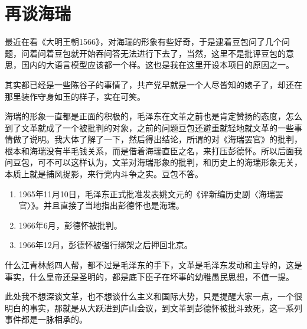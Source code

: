 \documentclass[12pt,oneside]{book}
\begin{document}
\chapter{再谈海瑞}
最近在看《大明王朝1566》，对海瑞的形象有些好奇，于是逮着豆包问了几个问题，问着问着豆包就开始吞问答无法进行下去了，当然，这里不是批评豆包的意思，国内的大语言模型应该都一个样。这也是我在这里开设本项目的原因之一。

其实都已经是一些陈谷子的事情了，共产党早就是一个人尽皆知的婊子了，却还在那里装作守身如玉的样子，实在可笑。

海瑞的形象一直都是正面的积极的，毛泽东在文革之前也是肯定赞扬的态度，怎么到了文革就成了一个被批判的对象，之前的问题豆包还避重就轻地就文革的一些事情做了说明。我大体了解了一下，然后得出结论，所谓的对《海瑞罢官》的批判，根本和海瑞没有半毛钱关系，而是借着海瑞直臣之名，来打压彭德怀。所以后面我问豆包，可不可以这样认为，文革对海瑞形象的批判，和历史上的海瑞形象无关，本质上就是捕风捉影，来行党内斗争之实。豆包不答。

\begin{enumerate}
\item 1965年11月10日，毛泽东正式批准发表姚文元的《评新编历史剧〈海瑞罢官〉》。并且直接了当地指出彭德怀也是海瑞。
\item 1966年6月，彭德怀被批判。
\item 1966年12月，彭德怀被强行绑架之后押回北京。
\end{enumerate}

什么江青林彪四人帮，都不过是毛泽东的手下，文革是毛泽东发动和主导的，这是事实，什么皇帝还是圣明的，都是底下臣子在坏事的幼稚愚民思想，不值一提。

此处我不想深谈文革，也不想谈什么主义和国际大势，只是提醒大家一点，一个很明白的事实，那就是从大跃进到庐山会议，到文革到彭德怀被批斗致死，这一系列事件都是一脉相承的。
\end{document}
